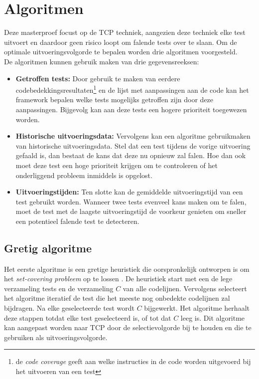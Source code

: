 \section{Algoritmen}
\noindent Deze masterproef focust op de TCP techniek, aangezien deze techniek elke test uitvoert en daardoor geen risico loopt om falende tests over te slaan. Om de optimale uitvoeringsvolgorde te bepalen worden drie algoritmen voorgesteld.\\

\noindent De algoritmen kunnen gebruik maken van drie gegevensreeksen:\\

\begin{itemize}
\item \textbf{Getroffen tests:} Door gebruik te maken van eerdere codebedekkingsresultaten\footnote{de \emph{code coverage} geeft aan welke instructies in de code worden uitgevoerd bij het uitvoeren van een test} en de lijst met aanpassingen aan de code kan het framework bepalen welke tests mogelijks getroffen zijn door deze aanpassingen. Bijgevolg kan aan deze tests een hogere prioriteit toegewezen worden.

\item \textbf{Historische uitvoeringsdata:} Vervolgens kan een algoritme gebruikmaken van historische uitvoeringsdata. Stel dat een test tijdens de vorige uitvoering gefaald is, dan bestaat de kans dat deze nu opnieuw zal falen. Hoe dan ook moet deze test een hoge prioriteit krijgen om te controleren of het onderliggend probleem inmiddels is opgelost.

\item \textbf{Uitvoeringstijden:} Ten slotte kan de gemiddelde uitvoeringstijd van een test gebruikt worden. Wanneer twee tests evenveel kans maken om te falen, moet de test met de laagste uitvoeringstijd de voorkeur genieten om sneller een potentieel falende test te detecteren.
\end{itemize}

\subsection{Gretig algoritme}
\noindent Het eerste algoritme is een gretige heuristiek die oorspronkelijk ontworpen is om het \emph{set-covering probleem} op te lossen \cite{evaluationoftestsuiteminimization}. De heuristiek start met een de lege verzameling tests en de verzameling $C$ van alle codelijnen. Vervolgens selecteert het algoritme iteratief de test die het meeste nog onbedekte codelijnen zal bijdragen. Na elke geselecteerde test wordt $C$ bijgewerkt. Het algoritme herhaalt deze stappen totdat elke test geselecteerd is, of tot dat $C$ leeg is. Dit algoritme kan aangepast worden naar TCP door de selectievolgorde bij te houden en die te gebruiken als uitvoeringsvolgorde.

